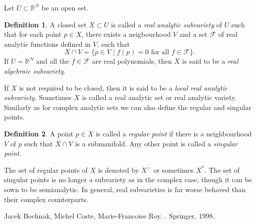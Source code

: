 \documentclass[12pt]{article}
\theoremstyle{theorem}
\theoremstyle{definition}
\newtheorem*{defn}{Definition}
\theoremstyle{remark}
\begin{document}
Let $U \subset {\mathbb{R}}^N$ be an open set.

\begin{defn}
A closed set $X \subset U$ is called a {\em real analytic subvariety}
of $U$ such that for each point $p \in X$, there exists a neigbourhood
$V$ and a set $\mathcal{F}$ of real analytic functions defined in $V$, such that 
\begin{equation*}
X \cap V = \{ p \in V \mid f(p) = 0 \text{ for all } f \in \mathcal{F} \}.
\end{equation*}
If $U = {\mathbb{R}}^N$ and all the $f \in \mathcal{F}$ are real polynomials, then
$X$ is said to be a {\em real algebraic subvariety}.
\end{defn}

If $X$ is not required to be closed, then it is said to be a {\em local real analytic subvariety}.
Sometimes $X$ is called a real analytic set or real analytic variety.  Similarly as for complex
analytic sets we can also define the regular and singular points.

\begin{defn}
A point $p \in X$ is called a {\em regular point} if there is a neighbourhood
$V$ of $p$ such that $X \cap V$ is a submanifold. Any other
point is called a {\em singular point}.
\end{defn}

The set of regular points of $X$ is denoted by $X^-$ or sometimes $X^*.$  The set of singular points
is no longer a subvariety as in the complex case, though it can be sown to be semianalytic.  In general, real subvarieties is far worse behaved than their complex counterparts.

\begin{thebibliography}{9}
Jacek Bochnak, Michel Coste, Marie-Francoise Roy.
{\em {}}.
Springer, 1998.
\end{thebibliography}

\end{document}
